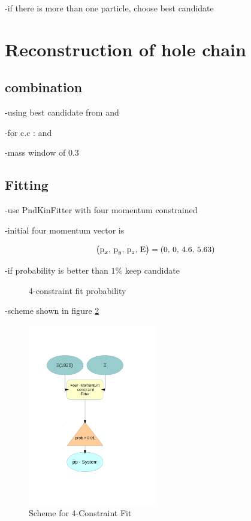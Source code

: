 		-if there is more than one particle, choose best candidate
	
\section{Reconstruction of hole chain}

	\subsection{combination}
	
	-using best candidate from \excitedcascade and \anticascade
	
	-for c.c : \excitedanticascade and \cascade
	
	-mass window of $0.3$\massunit
	
	
	\subsection{Fitting}
	
	-use PndKinFitter with four momentum constrained
	
	-initial four momentum vector is 
	\begin{center}
		\begin{equation}\nonumber
			\left(\textnormal{p}_x,\, \textnormal{p}_y,\, \textnormal{p}_z,\, \textnormal{E} \right) = \left(0,\, 0,\, 4.6,\, 5.63 \right)
		\end{equation}
	\end{center}
	
	
	-if probability is better than $1\%$ keep candidate
	
	\begin{figure}
		\centering
		\caption{4-constraint fit probability}
		\label{fig:xisys_prob}
	\end{figure}
	
	-scheme shown in figure \ref{fig:fourconstraintfit}
	
	\begin{figure}
		\centering
			\includegraphics[width=0.50\textwidth]{./plots/combineCascadeSys.pdf}
		\caption{Scheme for 4-Constraint Fit}
		\label{fig:fourconstraintfit}
	\end{figure}
	

